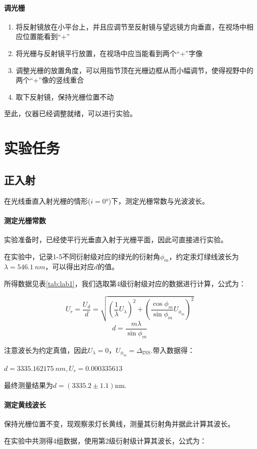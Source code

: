 \documentclass[UTF8,a4paper]{article}%
\begin{document}
\paragraph{调光栅}
\begin{enumerate}
    \item 将反射镜放在小平台上，并且应调节至反射镜与望远镜方向垂直，在视场中相应位置能看到“+”
    \item 将光栅与反射镜平行放置，在视场中应当能看到两个“+”字像
    \item 调整光栅的放置角度，可以用指节顶在光栅边框从而小幅调节，使得视野中的两个“+”像的竖线重合
    \item 取下反射镜，保持光栅位置不动
\end{enumerate}
至此，仪器已经调整就绪，可以进行实验。
\section{实验任务}
\subsection{正入射}
在光线垂直入射光栅的情形($i=\ang{0}$)下，测定光栅常数与光波波长。
\paragraph{测定光栅常数}
实验准备时，已经使平行光垂直入射于光栅平面，因此可直接进行实验。

在实验中，记录1-5不同衍射级对应的绿光的衍射角$\phi_m$，约定汞灯绿线波长为$\lambda=\qty{546.1}{nm}$，可以得出对应$d$的值。

所得数据见表\ref{tab:lab1}，我们选取第4级衍射级对应的数据进行计算，公式为：

$$U_{r}=\frac{U_{d}}{d}=\sqrt{(\frac{1}{\lambda}U_{\lambda})^{2}+(\frac{\cos\phi_{m}}{\sin\phi_{m}}U_{\phi_{m}})^{2}}$$
$$d=\frac{m\lambda}{\sin\phi_{m}}$$

注意波长为约定真值，因此$U_{\lambda}=0$，$U_{\phi_{m}}=\Delta_{\mathrm{INS}}$.带入数据得：

$d=\qty{3335.162175}{nm}, U_{r}=0.000335613$

最终测量结果为$d=(3335.2 \pm 1.1)\mathrm{nm}$.

\paragraph{测定黄线波长}
保持光栅位置不变，现观察汞灯长黄线，测量其衍射角并据此计算其波长。

在实验中共测得4组数据，使用第2级衍射级计算其波长，公式为：
\end{document}
